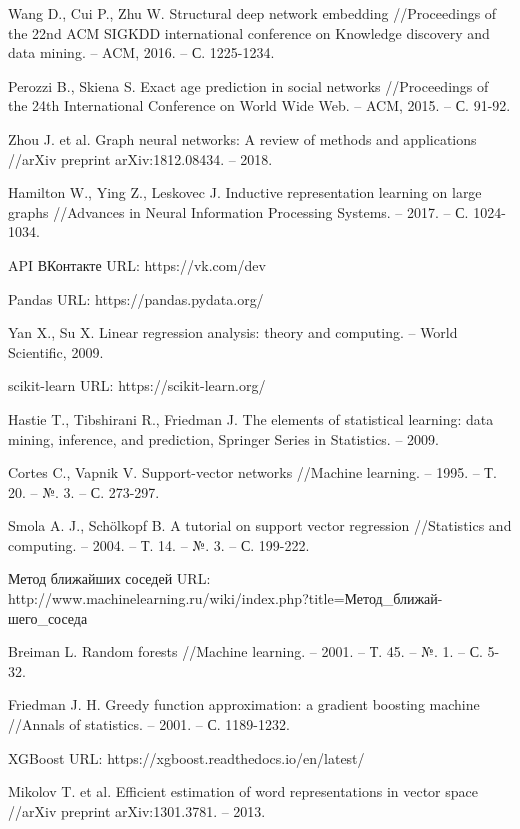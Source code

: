 \begin{thebibliography}{9}
Wang D., Cui P., Zhu W. Structural deep network embedding //Proceedings of the 22nd ACM SIGKDD international conference on Knowledge discovery and data mining. – ACM, 2016. – С. 1225-1234.

Perozzi B., Skiena S. Exact age prediction in social networks //Proceedings of the 24th International Conference on World Wide Web. – ACM, 2015. – С. 91-92.

Zhou J. et al. Graph neural networks: A review of methods and applications //arXiv preprint arXiv:1812.08434. – 2018.

Hamilton W., Ying Z., Leskovec J. Inductive representation learning on large graphs //Advances in Neural Information Processing Systems. – 2017. – С. 1024-1034.

API ВКонтакте URL: https://vk.com/dev

Pandas URL: https://pandas.pydata.org/

Yan X., Su X. Linear regression analysis: theory and computing. – World Scientific, 2009.

scikit-learn URL: https://scikit-learn.org/

Hastie T., Tibshirani R., Friedman J. The elements of statistical learning: data mining, inference, and prediction, Springer Series in Statistics. – 2009.

Cortes C., Vapnik V. Support-vector networks //Machine learning. – 1995. – Т. 20. – №. 3. – С. 273-297.

Smola A. J., Schölkopf B. A tutorial on support vector regression //Statistics and computing. – 2004. – Т. 14. – №. 3. – С. 199-222.

Метод ближайших соседей URL: \\
http://www.machinelearning.ru/wiki/index.php?title=Метод\_ближай-шего\_соседа

Breiman L. Random forests //Machine learning. – 2001. – Т. 45. – №. 1. – С. 5-32.

Friedman J. H. Greedy function approximation: a gradient boosting machine //Annals of statistics. – 2001. – С. 1189-1232.

XGBoost URL: https://xgboost.readthedocs.io/en/latest/

Mikolov T. et al. Efficient estimation of word representations in vector space //arXiv preprint arXiv:1301.3781. – 2013.

\end{thebibliography}
\endgroup

\clearpage